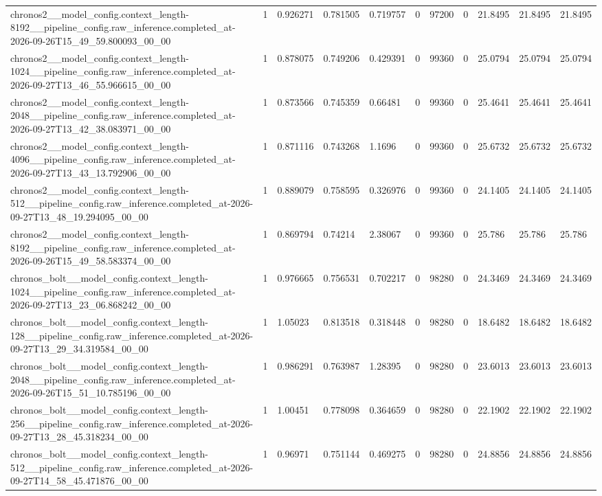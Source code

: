 \begin{tabular}{lllllllllll}
chronos2\_\_model\_config.context\_length-8192\_\_pipeline\_config.raw\_inference.completed\_at-2026-09-26T15\_49\_59.800093\_00\_00 & 1 & 0.926271 & 0.781505 & 0.719757 & 0 & 97200 & 0 & 21.8495 & 21.8495 & 21.8495 \\
chronos2\_\_model\_config.context\_length-1024\_\_pipeline\_config.raw\_inference.completed\_at-2026-09-27T13\_46\_55.966615\_00\_00 & 1 & 0.878075 & 0.749206 & 0.429391 & 0 & 99360 & 0 & 25.0794 & 25.0794 & 25.0794 \\
chronos2\_\_model\_config.context\_length-2048\_\_pipeline\_config.raw\_inference.completed\_at-2026-09-27T13\_42\_38.083971\_00\_00 & 1 & 0.873566 & 0.745359 & 0.66481 & 0 & 99360 & 0 & 25.4641 & 25.4641 & 25.4641 \\
chronos2\_\_model\_config.context\_length-4096\_\_pipeline\_config.raw\_inference.completed\_at-2026-09-27T13\_43\_13.792906\_00\_00 & 1 & 0.871116 & 0.743268 & 1.1696 & 0 & 99360 & 0 & 25.6732 & 25.6732 & 25.6732 \\
chronos2\_\_model\_config.context\_length-512\_\_pipeline\_config.raw\_inference.completed\_at-2026-09-27T13\_48\_19.294095\_00\_00 & 1 & 0.889079 & 0.758595 & 0.326976 & 0 & 99360 & 0 & 24.1405 & 24.1405 & 24.1405 \\
chronos2\_\_model\_config.context\_length-8192\_\_pipeline\_config.raw\_inference.completed\_at-2026-09-26T15\_49\_58.583374\_00\_00 & 1 & 0.869794 & 0.74214 & 2.38067 & 0 & 99360 & 0 & 25.786 & 25.786 & 25.786 \\
chronos\_bolt\_\_model\_config.context\_length-1024\_\_pipeline\_config.raw\_inference.completed\_at-2026-09-27T13\_23\_06.868242\_00\_00 & 1 & 0.976665 & 0.756531 & 0.702217 & 0 & 98280 & 0 & 24.3469 & 24.3469 & 24.3469 \\
chronos\_bolt\_\_model\_config.context\_length-128\_\_pipeline\_config.raw\_inference.completed\_at-2026-09-27T13\_29\_34.319584\_00\_00 & 1 & 1.05023 & 0.813518 & 0.318448 & 0 & 98280 & 0 & 18.6482 & 18.6482 & 18.6482 \\
chronos\_bolt\_\_model\_config.context\_length-2048\_\_pipeline\_config.raw\_inference.completed\_at-2026-09-26T15\_51\_10.785196\_00\_00 & 1 & 0.986291 & 0.763987 & 1.28395 & 0 & 98280 & 0 & 23.6013 & 23.6013 & 23.6013 \\
chronos\_bolt\_\_model\_config.context\_length-256\_\_pipeline\_config.raw\_inference.completed\_at-2026-09-27T13\_28\_45.318234\_00\_00 & 1 & 1.00451 & 0.778098 & 0.364659 & 0 & 98280 & 0 & 22.1902 & 22.1902 & 22.1902 \\
chronos\_bolt\_\_model\_config.context\_length-512\_\_pipeline\_config.raw\_inference.completed\_at-2026-09-27T14\_58\_45.471876\_00\_00 & 1 & 0.96971 & 0.751144 & 0.469275 & 0 & 98280 & 0 & 24.8856 & 24.8856 & 24.8856 \\

\end{tabular}
